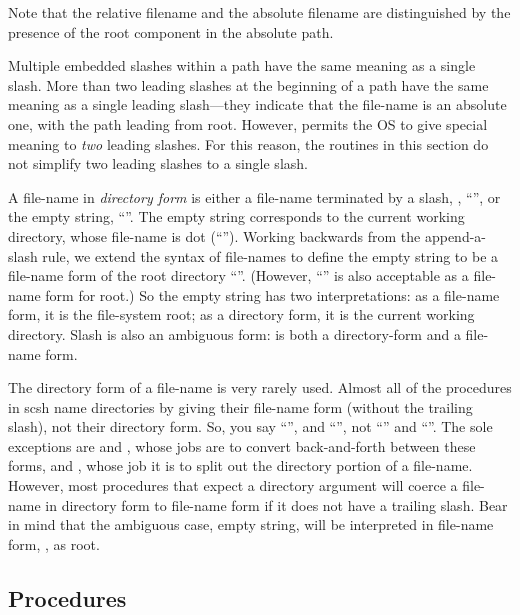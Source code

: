 Note that the relative filename  and the absolute filename
 are distinguished by the presence of the root component
 in the absolute path.

Multiple embedded slashes within a path have the same meaning as 
a single slash.
More than two leading slashes at the beginning of a path have the same
meaning as a single leading slash---they indicate that the file-name
is an absolute one, with the path leading from root.
However, {\Posix} permits the OS to give special meaning to 
\emph{two} leading slashes.
For this reason, the routines in this section do not simplify two leading
slashes to a single slash.

A file-name in \emph{directory form} is either a file-name terminated by 
a slash, \eg, ``'', or the empty string, ``''.
The empty string corresponds to the current working directory, 
whose file-name is dot (``'').
Working backwards from the append-a-slash rule, 
we extend the syntax of {\Posix} file-names to define the empty string
to be a file-name form of the root directory ``\ex{/}''.
(However, ``\ex{/}'' is also acceptable as a file-name form for root.)
So the empty string has two interpretations: 
as a file-name form, it is the file-system root;
as a directory form, it is the current working directory.
Slash is also an ambiguous form: \ex{/} is both a directory-form and
a file-name form.

The directory form of a file-name is very rarely used.
Almost all of the procedures in scsh name directories by giving
their file-name form (without the trailing slash), not their directory form.
So, you say ``'', and ``'', not
``'' and ``''.
The sole exceptions are
 and ,
whose jobs are to convert back-and-forth between these forms,
and , whose job it is to split out the
directory portion of a file-name.
However, most procedures that expect a directory argument will coerce
a file-name in directory form to file-name form if it does not have
a trailing slash.
Bear in mind that the ambiguous case, empty string, will be
interpreted in file-name form, \ie, as root.



\subsection{Procedures}

